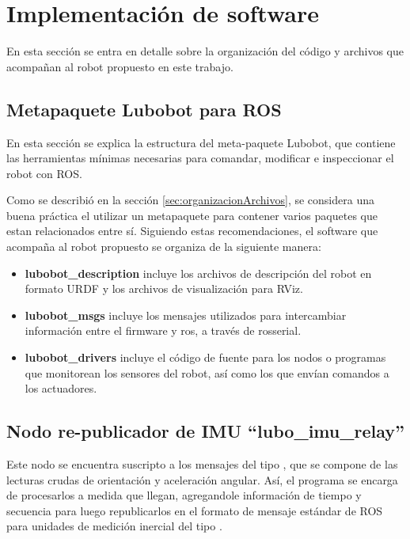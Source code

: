 \section{Implementación de software}

En esta sección se entra en detalle sobre la organización del código y archivos que acompañan al robot propuesto en este trabajo.

\subsection{Metapaquete Lubobot para ROS}

En esta sección se explica la estructura del meta-paquete Lubobot, que contiene las herramientas mínimas necesarias para comandar, modificar e inspeccionar el robot con ROS.

Como se describió en la sección \ref{sec:organizacionArchivos}, se considera una buena práctica el utilizar un metapaquete para contener varios paquetes que estan relacionados entre sí. Siguiendo estas recomendaciones, el software que acompaña al robot propuesto se organiza de la siguiente manera:

\begin{itemize}
  \item \textbf{lubobot\_description} incluye los archivos de descripción del robot en formato URDF y los archivos de visualización para RViz.
  \item \textbf{lubobot\_msgs} incluye los mensajes utilizados para intercambiar información entre el firmware y ros, a través de rosserial.
  \item \textbf{lubobot\_drivers} incluye el código de fuente para los nodos o programas que monitorean los sensores del robot, así como los que envían comandos a los actuadores.
\end{itemize}

\subsection{Nodo re-publicador de IMU ``lubo\_imu\_relay''}

Este nodo se encuentra suscripto a los mensajes del tipo , que se compone de las lecturas crudas de orientación y aceleración angular. Así, el programa se encarga de procesarlos a medida que llegan, agregandole información de tiempo y secuencia para luego republicarlos en el formato de mensaje estándar de ROS para unidades de medición inercial del tipo \protect\footnotemark.

